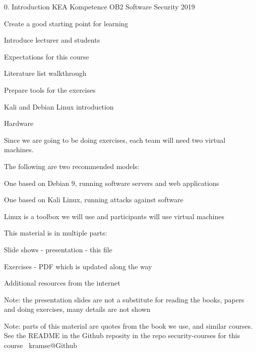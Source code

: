 \documentclass[Screen16to9,17pt]{foils}
\begin{document}
\mytitlepage
{0. Introduction}
{KEA Kompetence OB2 Software Security 2019}

\hlkprofiluk


\begin{list2}
\item Create a good starting point for learning
\item Introduce lecturer and students
\item Expectations for this course
\item Literature list walkthrough
\item Prepare tools for the exercises
\item Kali and Debian Linux introduction
\end{list2}


Hardware

Since we are going to be doing exercises, each team will need two virtual machines.

The following are two recommended models:
\begin{list2}
\item One based on Debian 9, running software servers and web applications
\item One based on Kali Linux, running attacks against software
\end{list2}

Linux is a toolbox we will use and participants will use virtual machines


\begin{list1}
\item This material is in multiple parts:
\begin{list2}
\item Slide shows - presentation - this file
\item Exercises - PDF which is updated along the way
\end{list2}
\item Additional resources from the internet
\item Note: the presentation slides are not a substitute for reading the books, papers and doing exercises, many details are not shown
\end{list1}

Note: parts of this material are quotes from the book we use, and similar courses. See the README in the Github reposity  in the repo security-courses for this course \jobname\ kramse@Github
\end{document}
